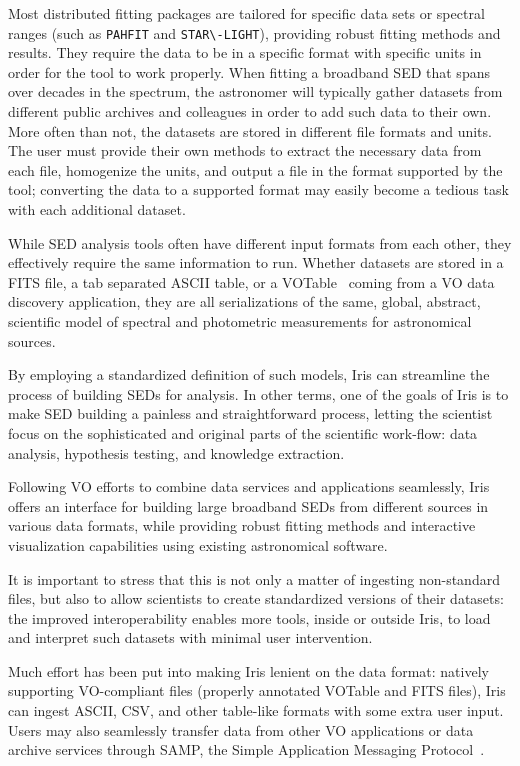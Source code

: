 \documentclass[final,5p,authoryear]{elsarticle}
\begin{document}
Most distributed fitting packages are tailored for specific data sets or
spectral ranges (such as \verb|PAHFIT| and \verb|STAR\-LIGHT|), providing robust
fitting methods and results. They require the data to be in a specific format
with specific units in order for the tool to work properly. When fitting a
broadband SED that spans over decades in the spectrum, the astronomer will
typically gather datasets from different public archives and colleagues in order
to add such data to their own. More often than not, the datasets are stored in
different file formats and units. 
The user must provide their own methods to extract the necessary data from each
file, homogenize the units, and output a file in the format supported by the
tool; converting the data to a supported format may easily become a tedious task
with each additional dataset.

While SED analysis tools often have different input formats from each other,
they effectively require the same information to run. Whether datasets are
stored in a FITS file, a tab separated ASCII table, or a VOTable~\citep{2011arXiv1110.0524O} coming from a
VO data discovery application, they are all serializations of the same, global,
abstract, scientific model of spectral and photometric measurements for
astronomical sources.

By employing a standardized definition of such models, Iris can streamline
the process of building SEDs for analysis. In other terms, one of the goals of
Iris is to make SED building a painless and straightforward process, letting the
scientist focus on the sophisticated and original parts of the scientific
work-flow: data analysis, hypothesis testing, and knowledge extraction.

Following VO efforts to combine data services and applications seamlessly, Iris
offers an interface for building large broadband SEDs from different sources in
various data formats, while providing robust fitting methods and interactive
visualization capabilities using existing astronomical software.

It is important to stress that this is not only a matter of ingesting
non-standard files, but also to allow scientists to create standardized versions
of their datasets: the improved interoperability enables more tools, inside or
outside Iris, to load and interpret such datasets with minimal user
intervention.

Much effort has been put into making Iris lenient on the data format: natively
supporting VO-compliant files (properly annotated
VOTable and FITS files), Iris can ingest ASCII, CSV,
and other table-like formats with some extra user input. Users may also
seamlessly transfer data from other VO applications or data archive services
through SAMP, the Simple Application Messaging
Protocol~\citep{2011arXiv1110.0528T}.
\end{document}
